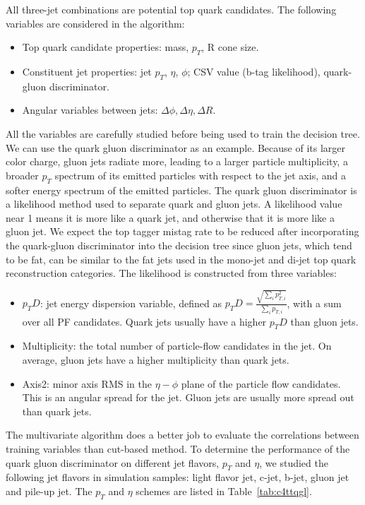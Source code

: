 All three-jet combinations are potential top quark candidates. The following variables are considered in the algorithm: 
\begin{itemize}
\item Top quark candidate properties: mass, $p_{T}$, R cone size.
\item Constituent jet properties: jet $p_{T}$, $\eta$, $\phi$; CSV value (b-tag likelihood), quark-gluon discriminator.
\item Angular variables between jets: $\Delta \phi, \Delta \eta, \Delta R$.
\end{itemize}

All the variables are carefully studied before being used to train the decision tree. We can use the quark gluon discriminator as an example. Because of its larger color charge, gluon jets radiate more, leading to a larger particle multiplicity, a broader $p_{T}$ spectrum of its emitted particles with respect to the jet axis, and a softer energy spectrum of the emitted particles. The quark gluon discriminator is a likelihood method used to separate quark and gluon jets. A likelihood value near 1 means it is more like a quark jet, and otherwise that it is more like a gluon jet. We expect the top tagger mistag rate to be reduced after incorporating the quark-gluon discriminator into the decision tree since gluon jets, which tend to be fat, can be similar to the fat jets used in the mono-jet and di-jet top quark reconstruction categories. The likelihood is constructed from three variables: 
\begin{itemize}
\item $p_{T}D$: jet energy dispersion variable, defined as $p_{T}D=\frac{\sqrt{\sum_{i}p_{T,i}^{2}}}{\sum_{i}p_{T,i}}$, with a sum over all PF candidates. Quark jets usually have a higher $p_{T}D$ than gluon jets.
\item Multiplicity: the total number of particle-flow candidates in the jet. On average, gluon jets have a higher multiplicity than quark jets.
\item Axis2: minor axis RMS in the $\eta - \phi$ plane of the particle flow candidates. This is an angular spread for the jet. Gluon jets are usually more spread out than quark jets.
\end{itemize}

The multivariate algorithm does a better job to evaluate the correlations between training variables than cut-based method. To determine the performance of the quark gluon discriminator on different jet flavors, $p_{T}$ and $\eta$, we studied the following jet flavors in \ttbar simulation samples: light flavor jet, c-jet, b-jet, gluon jet and pile-up jet. The $p_{T}$ and $\eta$ schemes are listed in Table~\ref{tab:c4ttqgl}.

